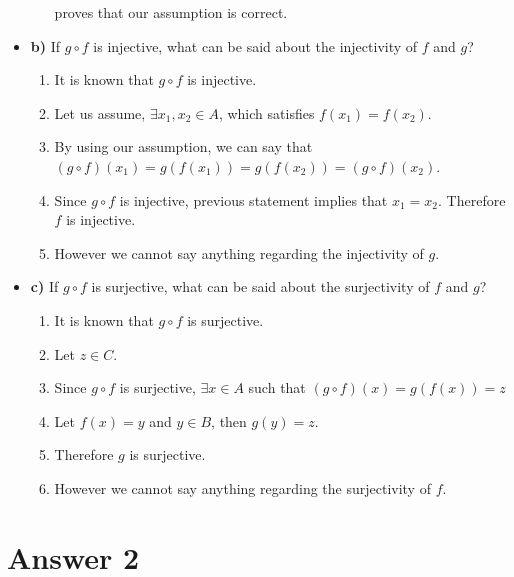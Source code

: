 \documentclass[12pt]{article}
\begin{document}
\begin{itemize}
\begin{enumerate}
proves that our assumption is correct. \\
\end{enumerate}
\item
\textbf{b)} If $g \circ f$ is injective, what can be said about the injectivity of $f$ and $g$?
\begin{enumerate}
\item It is known that $g \circ f$ is injective. 
\item Let us assume, $\exists x_1 , x_2 \in A$, which satisfies $f(x_1) = f(x_2)$.
\item By using our assumption, we can say that $ (g \circ f)(x_1) = g(f(x_1)) = g(f(x_2)) = (g \circ f)(x_2)$.
\item Since $g \circ f$ is injective, previous statement implies that $x_1 = x_2$. Therefore $f$ is injective. 
\item However we cannot say anything regarding the injectivity of $g$.
\end{enumerate} 
\item
\textbf{c)} If $g \circ f$ is surjective, what can be said about the surjectivity of $f$ and $g$?
\begin{enumerate}

\item It is known that $g \circ f$ is surjective. 
\item Let $z \in C$.
\item Since $g \circ f$ is surjective, $\exists x \in A$ such that $(g \circ f)(x) = g(f(x)) = z$
\item Let $f(x) = y$ and $y \in B$, then $g(y) = z$.
\item Therefore $g$ is surjective.
\item However we cannot say anything regarding the surjectivity of $f$.

\end{enumerate}
\end{itemize}


\section*{Answer 2}
\end{document}
